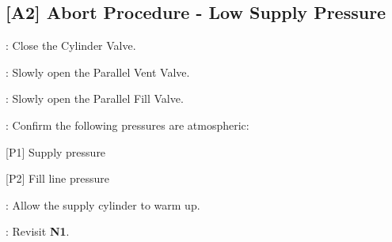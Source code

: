 \begin{checklist}
\subsection{[A2] Abort Procedure - Low Supply Pressure}
\begin{checklist}
    \item \primary{}: Close the Cylinder Valve.
    \item \primary{}: Slowly open the Parallel Vent Valve.
    \item \primary{}: Slowly open the Parallel Fill Valve.
    \item \control{}: Confirm the following pressures are atmospheric:
    \begin{checklist}
        \item {[P1]} Supply pressure
        \item {[P2]} Fill line pressure
    \end{checklist}
    \item \primary{}: Allow the supply cylinder to warm up.
    \item \ops{}: Revisit \textbf{N1}.
\end{checklist}
\setcounter{checklistnum}{0}


\end{checklist}
